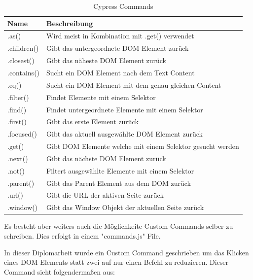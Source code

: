 \begin{table}[h]
\caption{Cypress Commands}
\label{demo-table}
    \begin{tabular}{ | m{2cm} | m{13cm} | } 
        \hline
        Name & Beschreibung \\ [0.5ex] 
        \hline\hline
        .as() & Wird meist in Kombination mit .get() verwendet \\
        \hline
        .children() & Gibt das untergeordnete DOM Element zurück \\
        \hline
        .closest() & Gibt das näheste DOM Element zurück \\
        \hline
        .contains() & Sucht ein DOM Element nach dem Text Content \\
        \hline
        .eq() & Sucht ein DOM Element mit dem genau gleichen Content  \\
        \hline
        .filter() & Findet Elemente mit einem Selektor \\
        \hline
        .find() & Findet untergeordnete Elemente mit einem Selektor \\
        \hline
        .first() & Gibt das erste Element zurück \\
        \hline
        .focused() & Gibt das aktuell ausgewählte DOM Element zurück \\
        \hline
        .get() & Gibt DOM Elemente welche mit einem Selektor gesucht werden \\
        \hline
        .next() & Gibt das nächste DOM Element zurück \\
        \hline
        .not() & Filtert ausgewählte Elemente mit einem Selektor \\
        \hline
        .parent() & Gibt das Parent Element aus dem DOM zurück \\
        \hline
        .url() & Gibt die URL der aktiven Seite zurück \\
        \hline
        .window() & Gibt das Window Objekt der aktuellen Seite zurück  \\
        \hline
    \end{tabular}
\end{table}

Es besteht aber weiters auch die Möglichkeite Custom Commands selber zu schreiben.
Dies erfolgt in einem "commands.js" File.

In dieser Diplomarbeit wurde ein Custom Command geschrieben um das Klicken eines DOM Elements statt zwei auf nur einen Befehl zu reduzieren. Dieser Command sieht folgendermaßen aus:


